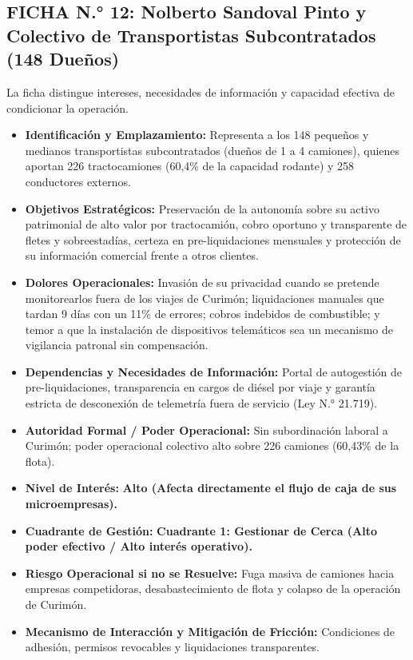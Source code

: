 \subsection*{FICHA N.° 12: Nolberto Sandoval Pinto y Colectivo de Transportistas Subcontratados (148 Dueños)}
La ficha distingue intereses, necesidades de información y capacidad efectiva de condicionar la operación.
\begin{itemize}
\item \textbf{Identificación y Emplazamiento:} Representa a los 148 pequeños y medianos transportistas subcontratados (dueños de 1 a 4 camiones), quienes aportan 226 tractocamiones (60,4\% de la capacidad rodante) y 258 conductores externos.
\item \textbf{Objetivos Estratégicos:} Preservación de la autonomía sobre su activo patrimonial de alto valor por tractocamión, cobro oportuno y transparente de fletes y sobreestadías, certeza en pre-liquidaciones mensuales y protección de su información comercial frente a otros clientes.
\item \textbf{Dolores Operacionales:} Invasión de su privacidad cuando se pretende monitorearlos fuera de los viajes de Curimón; liquidaciones manuales que tardan 9 días con un 11\% de errores; cobros indebidos de combustible; y temor a que la instalación de dispositivos telemáticos sea un mecanismo de vigilancia patronal sin compensación.
\item \textbf{Dependencias y Necesidades de Información:} Portal de autogestión de pre-liquidaciones, transparencia en cargos de diésel por viaje y garantía estricta de desconexión de telemetría fuera de servicio (Ley N.° 21.719).
\item \textbf{Autoridad Formal / Poder Operacional:} Sin subordinación laboral a Curimón; poder operacional colectivo alto sobre 226 camiones (60,43\% de la flota).
\item \textbf{Nivel de Interés:} \textbf{Alto (Afecta directamente el flujo de caja de sus microempresas).}
\item \textbf{Cuadrante de Gestión:} \textbf{Cuadrante 1: Gestionar de Cerca (Alto poder efectivo / Alto interés operativo).}
\item \textbf{Riesgo Operacional si no se Resuelve:} Fuga masiva de camiones hacia empresas competidoras, desabastecimiento de flota y colapso de la operación de Curimón.
\item \textbf{Mecanismo de Interacción y Mitigación de Fricción:} Condiciones de adhesión, permisos revocables y liquidaciones transparentes.
\end{itemize}
